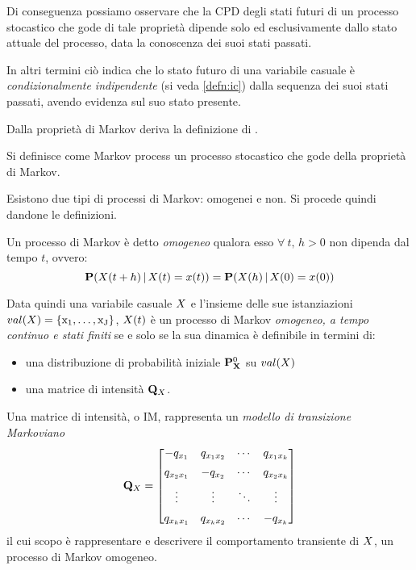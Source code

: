 Di conseguenza possiamo osservare che la \acl{CPD} degli stati futuri di un processo stocastico che gode di tale proprietà dipende solo ed esclusivamente dallo stato attuale del processo, data la conoscenza dei suoi stati passati.

In altri termini ciò indica che lo stato futuro di una variabile casuale è \emph{condizionalmente indipendente} (si veda \ref{defn:ic}) dalla sequenza dei suoi stati passati, avendo evidenza sul suo stato presente.

Dalla proprietà di Markov deriva la definizione di \mprocess{}.

\begin{definizione}[\mprocess{}]
Si definisce come Markov process un processo stocastico che gode della proprietà di Markov.
\end{definizione}

Esistono due tipi di processi di Markov: omogenei e non. Si procede quindi dandone le definizioni.

\begin{definizione}[\homm\mprocess]
\label{defn:homogeneus-markov-process}
Un processo di Markov è detto \emph{omogeneo} qualora esso $\forall\:t,\,h > 0$ non dipenda dal tempo $t$, ovvero:
\begin{equation}
\label{eq:homogeneus-markov-process}
\mathbf{P}(\mathnormal{X}(t + h)\,\arrowvert\,\mathnormal{X}(t)=x(t))=\mathbf{P}(\mathnormal{X}(h)\,\arrowvert\,\mathnormal{X}(0)=x(0))
\end{equation}
\end{definizione}
Data quindi una variabile casuale $\mathnormal{X}$ e l'insieme delle sue istanziazioni $val(\mathnormal{X})=\{ \mathrm{x_1}, \dotsc, \mathrm{x_J} \}$, $\mathnormal{X}(t)$ è un processo di Markov \emph{omogeneo, a tempo continuo e stati finiti} se e solo se la sua dinamica è definibile in termini di:
\begin{itemize}
    \item una distribuzione di probabilità iniziale $\mathbf{P}^0_{\mathbf{X}}$ su $val(\mathnormal{X})$
    \item una matrice di intensità $\mathbf{Q}_{\mathnormal{X}}$.
\end{itemize}

\begin{definizione}
\label{defn:im}
Una matrice di intensità, o \acf{IM}, rappresenta un \emph{modello di transizione Markoviano}
\[
\mathbf{Q}_{\mathnormal{X}}= \begin{bmatrix}
                        -q_{x_1}    & q_{x_1x_2}& \cdots & q_{x_1x_k}   \\[0.5em]
                        q_{x_2x_1}  & -q_{x_2}  & \cdots & q_{x_2x_k}   \\[0.5em]
                        \vdots      & \vdots    & \ddots & \vdots       \\[0.5em]
                        q_{x_kx_1}  & q_{x_kx_2}& \cdots & -q_{x_k}
                    \end{bmatrix}
\]
il cui scopo è rappresentare e descrivere il comportamento transiente di $\mathnormal{X}$, un processo di Markov omogeneo.
\end{definizione}

